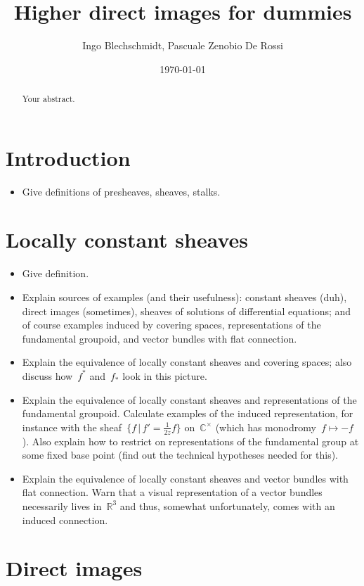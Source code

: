 \documentclass[10pt]{amsart}
\title{Higher direct images for dummies}
\author{Ingo Blechschmidt, Pascuale Zenobio De Rossi}
\date{\today}
\theoremstyle{definition}
\theoremstyle{plain}
\theoremstyle{remark}
\begin{document}
\begin{abstract}
Your abstract.
\end{abstract}

\maketitle

\section{Introduction}

\begin{itemize}
\item Give definitions of presheaves, sheaves, stalks.
\end{itemize}


\section{Locally constant sheaves}

\begin{itemize}
\item Give definition.
\item Explain sources of examples (and their usefulness): constant sheaves
(duh), direct images (sometimes), sheaves of solutions of differential
equations; and of course examples induced by covering spaces, representations
of the fundamental groupoid, and vector bundles with flat connection.
\item Explain the equivalence of locally constant sheaves and covering spaces;
also discuss how~$f^*$ and~$f_*$ look in this picture.
\item Explain the equivalence of locally constant sheaves and representations
of the fundamental groupoid. Calculate examples of the induced representation,
for instance with the sheaf~$\{ f \,|\, f' = \frac{1}{2z} f \}$
on~$\mathbb{C}^\times$ (which has monodromy~$f \mapsto -f$). Also explain how
to restrict on representations of the fundamental group at some fixed base
point (find out the technical hypotheses needed for this).
\item Explain the equivalence of locally constant sheaves and vector bundles
with flat connection. Warn that a visual representation of a vector bundles
necessarily lives in~$\mathbb{R}^3$ and thus, somewhat unfortunately, comes
with an induced connection.
\end{itemize}


\section{Direct images}
\end{document}

